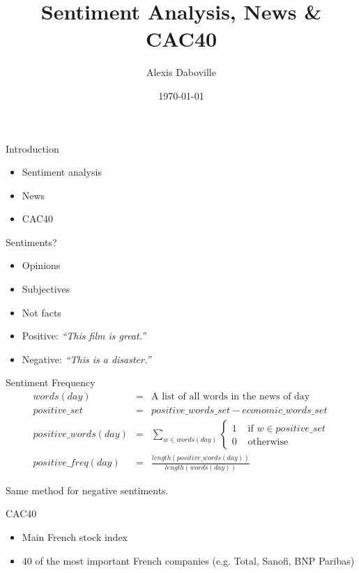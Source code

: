 \documentclass{beamer}
\title{Sentiment Analysis, News \& CAC40}
\author{Alexis Daboville}
\institute{Trinity College Dublin}
\date{\today}
\begin{document}
\begin{frame}
	\titlepage
\end{frame}

\begin{frame}{Introduction}
	\begin{itemize}
		\item Sentiment analysis
		\item News
		\item CAC40
	\end{itemize}
\end{frame}

\begin{frame}{Sentiments?}
	\begin{itemize}
		\item Opinions
		\item Subjectives
		\item Not facts
	\end{itemize}

	\pause

	\begin{itemize}
		\item Positive: \emph{``This film is {\color{green}great}.''}
		\item Negative: \emph{``This is a {\color{red}disaster}.''}
	\end{itemize}
\end{frame}

\begin{frame}{Sentiment Frequency}
	\begin{eqnarray*}
		words(day) &=& \textrm{A list of all words in the news of day}\\
  positive\_set &=& positive\_words\_set - economic\_words\_set\\
	positive\_words(day) &=& \sum_{w \in words(day)} \begin{cases}1 & \textrm{ if }w \in positive\_set\\ 0 & \mbox{ otherwise }\end{cases}\\
		positive\_freq(day) &=& \frac{length(positive\_words(day))}{length(words(day))}
	\end{eqnarray*}

	\pause

	Same method for negative sentiments.

\end{frame}

\begin{frame}{CAC40}
	\begin{itemize}
		\item Main French stock index
		\item 40 of the most important French companies (e.g. Total, Sanofi, BNP Paribas)
	\end{itemize}
\end{frame}
\end{document}
